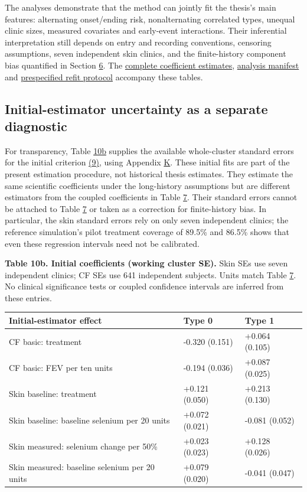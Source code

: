 \documentclass[11pt]{article}
\begin{document}
The analyses demonstrate that the method can jointly fit the thesis's main features: alternating onset/ending risk, nonalternating correlated types, unequal clinic sizes, measured covariates and early-event interactions. Their inferential interpretation still depends on entry and recording conventions, censoring assumptions, seven independent skin clinics, and the finite-history component bias quantified in Section \hyperref[sec:6]{6}. The \href{../results/data_analysis/thesis_boundary_v02/estimates.csv}{complete coefficient estimates}, \href{../results/data_analysis/thesis_boundary_v02/manifest.json}{analysis manifest} and \href{../docs/reproducibility.md}{prespecified refit protocol} accompany these tables.

\subsection{Initial-estimator uncertainty as a separate diagnostic}\label{sec:7.5}

For transparency, Table \hyperref[tab:10b]{10b} supplies the available whole-cluster standard errors for the initial criterion \hyperref[eq:9]{(9)}, using Appendix \hyperref[sec:K]{K}. These initial fits are part of the present estimation procedure, not historical thesis estimates. They estimate the same scientific coefficients under the long-history assumptions but are different estimators from the coupled coefficients in Table \hyperref[tab:7]{7}. Their standard errors cannot be attached to Table \hyperref[tab:7]{7} or taken as a correction for finite-history bias. In particular, the skin standard errors rely on only seven independent clinics; the reference simulation's pilot treatment coverage of 89.5\% and 86.5\% shows that even these regression intervals need not be calibrated.

\label{tab:10b}
\textbf{Table 10b. Initial coefficients (working cluster SE).} Skin SEs use seven independent clinics; CF SEs use 641 independent subjects. Units match Table \hyperref[tab:7]{7}. No clinical significance tests or coupled confidence intervals are inferred from these entries.

{
\begin{longtable}{lll}
\toprule
\textbf{Initial-estimator effect} & \textbf{Type 0} & \textbf{Type 1} \\
\midrule
\endhead
\bottomrule
\endlastfoot
CF basic: treatment & -0.320 (0.151) & +0.064 (0.105) \\
CF basic: FEV per ten units & -0.194 (0.036) & +0.087 (0.025) \\
Skin baseline: treatment & +0.121 (0.050) & +0.213 (0.130) \\
Skin baseline: baseline selenium per 20 units & +0.072 (0.021) & -0.081 (0.052) \\
Skin measured: selenium change per 50\% & +0.023 (0.023) & +0.128 (0.026) \\
Skin measured: baseline selenium per 20 units & +0.079 (0.020) & -0.041 (0.047) \\
\end{longtable}}
\end{document}
